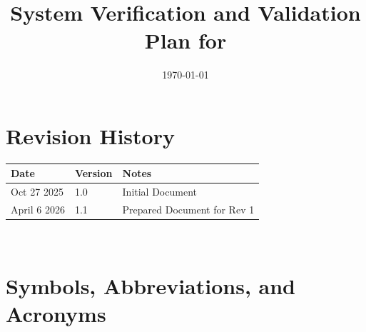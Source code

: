 \documentclass[12pt, titlepage]{article}
\begin{document}
\title{System Verification and Validation Plan for \progname{}} 
\author{\authname}
\date{\today}
	
\maketitle


\section*{Revision History}

\begin{tabularx}{\textwidth}{p{3cm}p{2cm}X}
\toprule {\bf Date} & {\bf Version} & {\bf Notes}\\
\midrule
Oct 27 2025 & 1.0 & Initial Document\\
\midrule
April 6 2026 & 1.1 & Prepared Document for Rev 1\\
\bottomrule
\end{tabularx}

~\\

\newpage

\tableofcontents
\newpage

\section{Symbols, Abbreviations, and Acronyms}
\end{document}
